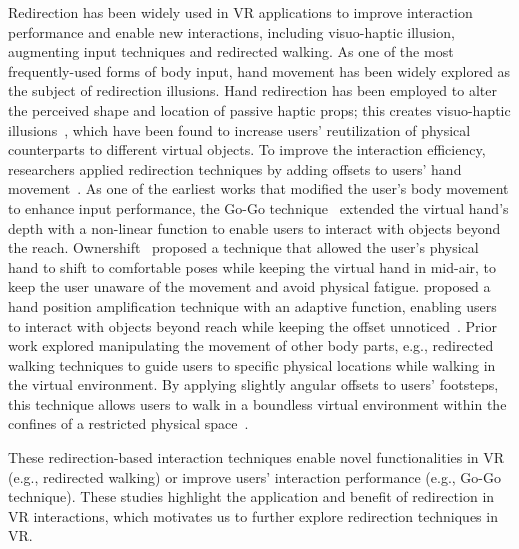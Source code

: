 Redirection has been widely used in VR applications to improve interaction performance and enable new interactions, including visuo-haptic illusion, augmenting input techniques and redirected walking.
As one of the most frequently-used forms of body input, hand movement has been widely explored as the subject of redirection illusions.
Hand redirection has been employed to alter the perceived shape \cite{redirectedtouching, zhao2018functional} and location \cite{HapticRetargeting, cheng2017sparse} of passive haptic props; this creates visuo-haptic illusions~\cite{yu2020pseudo}, which have been found to increase users' reutilization of physical counterparts to different virtual objects. 
To improve the interaction efficiency, researchers applied redirection techniques by adding offsets to users' hand movement~\cite{frees2007prism, montano2017erg}.
As one of the earliest works that modified the user's body movement to enhance input performance, the Go-Go technique~\cite{poupyrev1996go} extended the virtual hand's depth with a non-linear function to enable users to interact with objects beyond the reach.
Ownershift~\cite{feuchtner2018ownershift} proposed a technique that allowed the user’s physical hand to shift to comfortable poses while keeping the virtual hand in mid-air, to keep the user unaware of the movement and avoid physical fatigue.
\citeauthor{wentzel2020improving} proposed a hand position amplification technique with an adaptive function, enabling users to interact with objects beyond reach while keeping the offset unnoticed~\cite{wentzel2020improving}.
Prior work explored manipulating the movement of other body parts, e.g.,
redirected walking techniques to guide users to specific physical locations while walking in the virtual environment.
By applying slightly angular offsets to users' footsteps, this technique allows users to walk in a boundless virtual environment within the confines of a restricted physical space~\cite{RDWroom-scale, rietzler2020telewalk}.

These redirection-based interaction techniques enable novel functionalities in VR (e.g., redirected walking) or improve users' interaction performance (e.g., Go-Go technique).
These studies highlight the application and benefit of redirection in VR interactions, which motivates us to further explore redirection techniques in VR.



